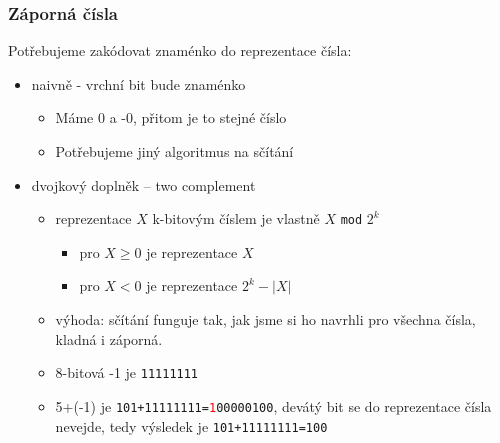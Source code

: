 \documentclass{beamer}
\begin{document}
\begin{frame}
\frametitle{Záporná čísla}

Potřebujeme zakódovat znaménko do reprezentace čísla:
\begin{itemize}
\item naivně - vrchní bit bude znaménko
\begin{itemize}
\item Máme 0 a -0, přitom je to stejné číslo
\item Potřebujeme jiný algoritmus na sčítání  
\end{itemize}
\item dvojkový doplněk -- two complement
\begin{itemize}
\item reprezentace $X$ k-bitovým číslem je vlastně $X$ \texttt{mod} $2^k$
\begin{itemize}
\item pro $X\ge0$ je reprezentace $X$
\item pro $X<0$ je reprezentace $2^k-|X|$
\end{itemize}
\item výhoda: sčítání funguje tak, jak jsme si ho navrhli pro všechna čísla, kladná i záporná.
\end{itemize}
\begin{itemize}
\item 8-bitová -1 je \texttt{11111111}
\item 5+(-1) je \texttt{101+11111111=\textcolor{red}{1}00000100}, devátý bit se do reprezentace čísla nevejde, tedy výsledek je \texttt{101+11111111=100}
\end{itemize}
\end{itemize}


\end{frame}
\end{document}
